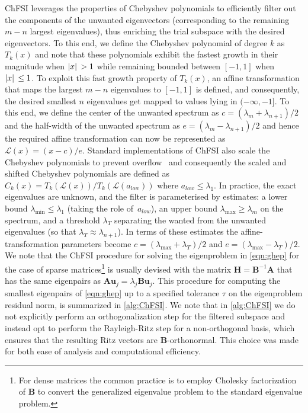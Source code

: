 \documentclass[preprint,3p,number,sort&compress]{elsarticle}
\newcommand{\bu}{\textbf{u}}
\newcommand{\bA}{\textbf{A}}
\newcommand{\bB}{\textbf{B}}
\newcommand{\bH}{\textbf{H}}
\DeclarePairedDelimiter\abs{\lvert}{\rvert\,}%
\begin{document}
ChFSI leverages the properties of Chebyshev polynomials to efficiently filter out the components of the unwanted eigenvectors (corresponding to the remaining $m-n$ largest eigenvalues), thus enriching the trial subspace with the desired eigenvectors. To this end, we define the Chebyshev polynomial of degree $k$ as $T_k(x)$ and note that these polynomials exhibit the fastest growth in their magnitude when $\abs{x}>1$ while remaining bounded between $[-1,1]$ when $\abs{x}\leq 1$. To exploit this fast growth property of $T_k(x)$, an affine transformation that maps the largest $m-n$ eigenvalues to $[-1,1]$ is defined, and consequently, the desired smallest $n$ eigenvalues get mapped to values lying in $(-\infty,-1]$. To this end, we define the center of the unwanted spectrum as $c=(\lambda_{m}+\lambda_{n+1})/2$ and the half-width of the unwanted spectrum as $e=(\lambda_{m}-\lambda_{n+1})/2$ and hence the required affine transformation can now be represented as $\mathcal{L}(x)= (x-c)/e$. Standard implementations of ChFSI also scale the Chebyshev polynomials to prevent overflow~\cite{saadChebyshevAccelerationTechniques1984,saadNumericalMethodsLarge2011,zhouParallelSelfconsistentfieldCalculations2006,zhouSelfconsistentfieldCalculationsUsing2006,zhouChebyshevfilteredSubspaceIteration2014,winkelmannChASE2019} and consequently the scaled and shifted Chebyshev polynomials are defined as $C_k(x)= T_k(\mathcal{L}(x))/T_k(\mathcal{L}(a_{low}))$ where $a_{low}\leq\lambda_1$. In practice, the exact eigenvalues are unknown, and the filter is parameterised by estimates: a lower bound $\lambda_{\min}\leq\lambda_1$ (taking the role of~$a_{low}$), an upper bound $\lambda_{\max}\geq\lambda_m$ on the spectrum, and a threshold $\lambda_T$ separating the wanted from the unwanted eigenvalues (so that $\lambda_T\approx\lambda_{n+1}$). In terms of these estimates the affine-transformation parameters become $c=(\lambda_{\max}+\lambda_T)/2$ and $e=(\lambda_{\max}-\lambda_T)/2$. We note that the ChFSI procedure for solving the eigenproblem in \cref{eqn:ghep} for the case of sparse matrices\footnote{For dense matrices the common practice is to employ Cholesky factorization of $\bB$ to convert the generalized eigenvalue problem to the standard eigenvalue problem.} is usually devised with the matrix $\bH=\bB^{-1}\bA$ that has the same eigenpairs as $\bA\bu_j=\lambda_j\bB\bu_j$.
This procedure for computing the smallest eigenpairs of \cref{eqn:ghep} up to a specified tolerance $\tau$ on the eigenproblem residual norm, is summarized in \cref{alg:ChFSI}. We note that in \cref{alg:ChFSI} we do not explicitly perform an orthogonalization step for the filtered subspace and instead opt to perform the Rayleigh-Ritz step for a non-orthogonal basis, which ensures that the resulting Ritz vectors are $\bB$-orthonormal. This choice was made for both ease of analysis and computational efficiency.
\end{document}
